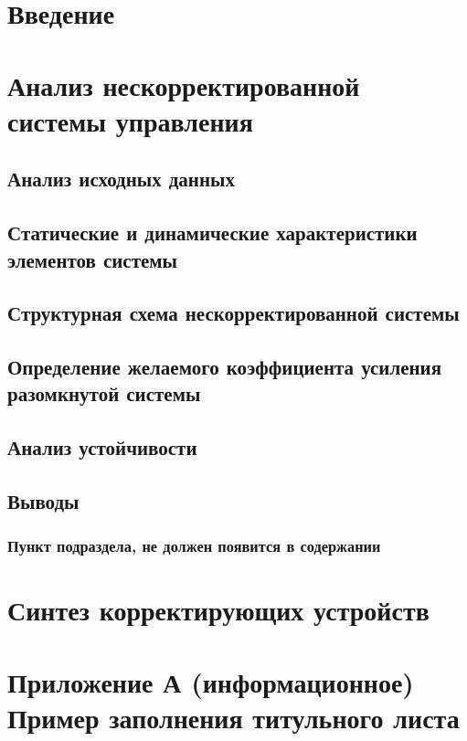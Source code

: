 \section*{Введение}
 \pagebreak
\section{Анализ нескорректированной системы управления} \pagebreak
\subsection{Анализ исходных данных} \pagebreak 
\subsection{Статические и динамические характеристики элементов системы} \pagebreak 
\subsection{Структурная схема нескорректированной системы} \pagebreak 
\subsection{Определение желаемого коэффициента усиления разомкнутой системы} \pagebreak 
\subsection{Анализ устойчивости} \pagebreak 
\subsection{Выводы} \pagebreak 
\subsubsection{Пункт подраздела, не должен появится в содержании} \pagebreak
\section{Синтез корректирующих устройств} \pagebreak
\section*{Приложение А (информационное)  Пример заполнения титульного листа} 
 \pagebreak


\begin{thebibliography}{99}
\end{thebibliography}

